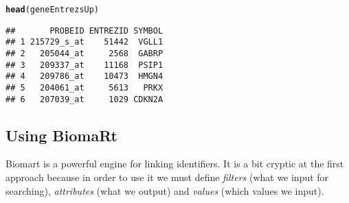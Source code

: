 \documentclass{article}\usepackage[]{graphicx}\usepackage[]{color}
\makeatletter
\newcommand{\hlstd}[1]{\textcolor[rgb]{0.345,0.345,0.345}{#1}}%
\newcommand{\hlkwd}[1]{\textcolor[rgb]{0.737,0.353,0.396}{\textbf{#1}}}%
\newenvironment{kframe}{%
 \def\at@end@of@kframe{}%
 \ifinner\ifhmode%
  \def\at@end@of@kframe{\end{minipage}}%
  \begin{minipage}{\columnwidth}%
 \fi\fi%
 \def\FrameCommand##1{\hskip\@totalleftmargin \hskip-\fboxsep
 \colorbox{shadecolor}{##1}\hskip-\fboxsep
     \hskip-\linewidth \hskip-\@totalleftmargin \hskip\columnwidth}%
 \MakeFramed {\advance\hsize-\width
   \@totalleftmargin\z@ \linewidth\hsize
   \@setminipage}}%
 {\par\unskip\endMakeFramed%
 \at@end@of@kframe}
\newenvironment{knitrout}{}{} %
\makeatother
\begin{document}
\begin{knitrout}
\begin{kframe}
{\ttfamily\noindent\itshape\color{messagecolor}{\#\# 'select()' returned 1:1 mapping between keys and columns}}\begin{alltt}
\hlkwd{head}\hlstd{(geneEntrezsUp)}
\end{alltt}
\begin{verbatim}
##       PROBEID ENTREZID SYMBOL
## 1 215729_s_at    51442  VGLL1
## 2   205044_at     2568  GABRP
## 3   209337_at    11168  PSIP1
## 4   209786_at    10473  HMGN4
## 5   204061_at     5613   PRKX
## 6   207039_at     1029 CDKN2A
\end{verbatim}
\end{kframe}
\end{knitrout}

\subsection{Using BiomaRt}

Biomart is a powerful engine for linking identifiers.
It is a bit cryptic at the first approach because in order to use it we must define \emph{filters} (what we input for searching), \emph{attributes} (what we output) and \emph{values} (which values we input).
\end{document}
